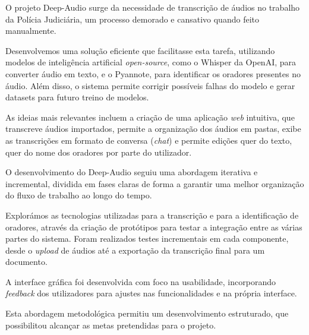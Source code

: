 




O projeto Deep-Audio surge da necessidade de transcrição de áudios no trabalho da Polícia Judiciária, um processo demorado e cansativo quando feito manualmente. 

Desenvolvemos uma solução eficiente que facilitasse esta tarefa, utilizando modelos de inteligência artificial \textit{open-source}, como o Whisper da OpenAI, para converter áudio em texto, e o Pyannote, para identificar os oradores presentes no áudio. Além disso, o sistema permite corrigir possíveis falhas do modelo e gerar datasets para futuro treino de modelos.

As ideias mais relevantes incluem a criação de uma aplicação \textit{web} intuitiva, que transcreve áudios importados, permite a organização dos áudios em pastas, exibe as transcrições em formato de conversa (\textit{chat}) e permite edições quer do texto, quer do nome dos oradores por parte do utilizador.

O desenvolvimento do Deep-Audio seguiu uma abordagem iterativa e incremental, dividida em fases claras de forma a garantir uma melhor organização do fluxo de trabalho ao longo do tempo. 

Explorámos as tecnologias utilizadas para a transcrição e para a identificação de oradores, através da criação de protótipos para testar a integração entre as várias partes do sistema. Foram realizados testes incrementais em cada componente, desde o \textit{upload} de áudios até a exportação da transcrição final para um documento.

A interface gráfica foi desenvolvida com foco na usabilidade, incorporando \textit{feedback} dos utilizadores para ajustes nas funcionalidades e na própria interface. 

Esta abordagem metodológica permitiu um desenvolvimento estruturado, que possibilitou alcançar as metas pretendidas para o projeto.





